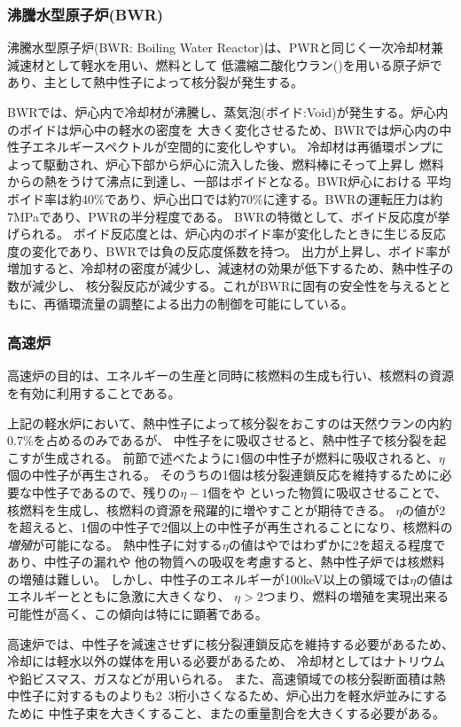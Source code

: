\subsubsection{沸騰水型原子炉(BWR)}
沸騰水型原子炉(BWR: Boiling Water Reactor)は、PWRと同じく一次冷却材兼減速材として軽水を用い、燃料として
低濃縮二酸化ウラン()を用いる原子炉であり、主として熱中性子によって核分裂が発生する。

BWRでは、炉心内で冷却材が沸騰し、蒸気泡(ボイド:Void)が発生する。炉心内のボイドは炉心中の軽水の密度を
大きく変化させるため、BWRでは炉心内の中性子エネルギースペクトルが空間的に変化しやすい。
冷却材は再循環ポンプによって駆動され、炉心下部から炉心に流入した後、燃料棒にそって上昇し
燃料からの熱をうけて沸点に到達し、一部はボイドとなる。BWR炉心における
平均ボイド率は約40\%であり、炉心出口では約70\%に達する。BWRの運転圧力は約7MPaであり、PWRの半分程度である。
BWRの特徴として、ボイド反応度が挙げられる。
ボイド反応度とは、炉心内のボイド率が変化したときに生じる反応度の変化であり、BWRでは負の反応度係数を持つ。
出力が上昇し、ボイド率が増加すると、冷却材の密度が減少し、減速材の効果が低下するため、熱中性子の数が減少し、
核分裂反応が減少する。これがBWRに固有の安全性を与えるとともに、再循環流量の調整による出力の制御を可能にしている。
\subsubsection{高速炉}
高速炉の目的は、エネルギーの生産と同時に核燃料の生成も行い、核燃料の資源を有効に利用することである。

上記の軽水炉において、熱中性子によって核分裂をおこすのは天然ウランの内約0.7\%を占めるのみであるが、
中性子をに吸収させると、熱中性子で核分裂を起こすが生成される。
前節で述べたように1個の中性子が燃料に吸収されると、$\eta$個の中性子が再生される。
そのうちの1個は核分裂連鎖反応を維持するために必要な中性子であるので、残りの$\eta - 1$個をや
といった物質に吸収させることで、核燃料を生成し、核燃料の資源を飛躍的に増やすことが期待できる。
$\eta$の値が2を超えると、1個の中性子で2個以上の中性子が再生されることになり、核燃料の\emph{増殖}が可能になる。
熱中性子に対する$\eta$の値はやではわずかに2を超える程度であり、中性子の漏れや
他の物質への吸収を考慮すると、熱中性子炉では核燃料の増殖は難しい。
しかし、中性子のエネルギーが100keV以上の領域では$\eta$の値はエネルギーとともに急激に大きくなり、
$\eta > 2$つまり、燃料の増殖を実現出来る可能性が高く、この傾向は特にに顕著である。

高速炉では、中性子を減速させずに核分裂連鎖反応を維持する必要があるため、冷却には軽水以外の媒体を用いる必要があるため、
冷却材としてはナトリウムや鉛ビスマス、ガスなどが用いられる。
また、高速領域での核分裂断面積は熱中性子に対するものよりも2~3桁小さくなるため、炉心出力を軽水炉並みにするために
中性子束を大きくすること、またの重量割合を大きくする必要がある。

\printbibliography[segment=\therefsegment,heading=subbibliography]

\newpage
